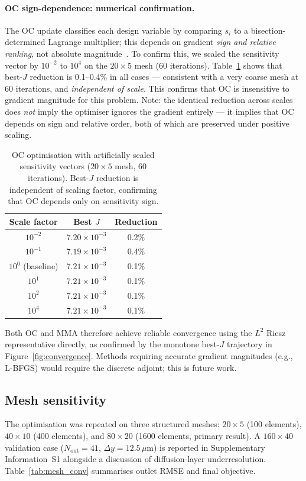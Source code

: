 \paragraph{OC sign-dependence: numerical confirmation.}
The OC update classifies each design variable by comparing
$s_i$ to a bisection-determined Lagrange multiplier;
this depends on gradient \emph{sign and relative ranking},
not absolute magnitude~\cite{bendsoe2003}.
To confirm this, we scaled the sensitivity vector by
$10^{-2}$ to $10^4$ on the $20\times5$ mesh (60 iterations).
Table~\ref{tab:scaling} shows that best-$J$ reduction
is 0.1--0.4\% in all cases --- consistent with a very coarse
mesh at 60 iterations, and \emph{independent of scale}.
This confirms that OC is insensitive to gradient magnitude
for this problem.
Note: the identical reduction across scales does \emph{not}
imply the optimiser ignores the gradient entirely ---
it implies that OC depends on sign and relative order,
both of which are preserved under positive scaling.

\begin{table}[h]
\centering\small
\caption{OC optimisation with artificially scaled sensitivity vectors
         ($20\times5$ mesh, 60 iterations). Best-$J$ reduction is
         independent of scaling factor, confirming that OC depends
         only on sensitivity sign.}
\label{tab:scaling}
\begin{tabular}{@{}ccc@{}}
\toprule
Scale factor & Best $J$ & Reduction \\
\midrule
$10^{-2}$ & $7.20\times10^{-3}$ & 0.2\% \\
$10^{-1}$ & $7.19\times10^{-3}$ & 0.4\% \\
$10^{0}$ (baseline) & $7.21\times10^{-3}$ & 0.1\% \\
$10^{1}$ & $7.21\times10^{-3}$ & 0.1\% \\
$10^{2}$ & $7.21\times10^{-3}$ & 0.1\% \\
$10^{4}$ & $7.21\times10^{-3}$ & 0.1\% \\
\bottomrule
\end{tabular}
\end{table}

Both OC and MMA therefore achieve reliable convergence
using the $L^2$ Riesz representative directly,
as confirmed by the monotone best-$J$ trajectory
in Figure~\ref{fig:convergence}.
Methods requiring accurate gradient magnitudes (e.g., L-BFGS)
would require the discrete adjoint; this is future work.

\subsection{Mesh sensitivity}
\label{sec:mesh_conv}
The optimisation was repeated on three structured meshes:
$20\times5$ (100 elements), $40\times10$ (400 elements), and
$80\times20$ (1600 elements, primary result).
A $160\times40$ validation case ($N_{\mathrm{out}}=41$,
$\Delta y = 12.5\,\mu$m) is reported in
Supplementary Information~S1 alongside a discussion of diffusion-layer
underresolution.
Table~\ref{tab:mesh_conv} summarises outlet RMSE and final objective.

